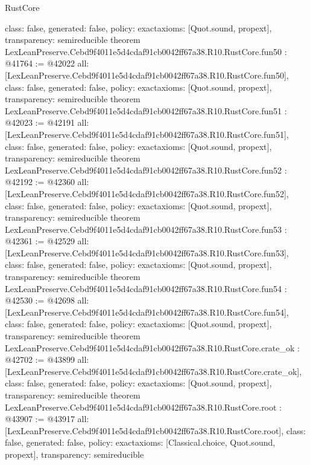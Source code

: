 \begin{lexlean}{RustCore}
\begin{coremodule}
{  class: false,
  generated: false,
  policy: exact{axioms: [Quot.sound, propext]},
  transparency: semireducible
}
theorem LexLeanPreserve.Cebd9f4011e5d4cdaf91cb0042ff67a38.R10.RustCore.fun50 : @41764 := @42022 {
  all: [LexLeanPreserve.Cebd9f4011e5d4cdaf91cb0042ff67a38.R10.RustCore.fun50],
  class: false,
  generated: false,
  policy: exact{axioms: [Quot.sound, propext]},
  transparency: semireducible
}
theorem LexLeanPreserve.Cebd9f4011e5d4cdaf91cb0042ff67a38.R10.RustCore.fun51 : @42023 := @42191 {
  all: [LexLeanPreserve.Cebd9f4011e5d4cdaf91cb0042ff67a38.R10.RustCore.fun51],
  class: false,
  generated: false,
  policy: exact{axioms: [Quot.sound, propext]},
  transparency: semireducible
}
theorem LexLeanPreserve.Cebd9f4011e5d4cdaf91cb0042ff67a38.R10.RustCore.fun52 : @42192 := @42360 {
  all: [LexLeanPreserve.Cebd9f4011e5d4cdaf91cb0042ff67a38.R10.RustCore.fun52],
  class: false,
  generated: false,
  policy: exact{axioms: [Quot.sound, propext]},
  transparency: semireducible
}
theorem LexLeanPreserve.Cebd9f4011e5d4cdaf91cb0042ff67a38.R10.RustCore.fun53 : @42361 := @42529 {
  all: [LexLeanPreserve.Cebd9f4011e5d4cdaf91cb0042ff67a38.R10.RustCore.fun53],
  class: false,
  generated: false,
  policy: exact{axioms: [Quot.sound, propext]},
  transparency: semireducible
}
theorem LexLeanPreserve.Cebd9f4011e5d4cdaf91cb0042ff67a38.R10.RustCore.fun54 : @42530 := @42698 {
  all: [LexLeanPreserve.Cebd9f4011e5d4cdaf91cb0042ff67a38.R10.RustCore.fun54],
  class: false,
  generated: false,
  policy: exact{axioms: [Quot.sound, propext]},
  transparency: semireducible
}
theorem LexLeanPreserve.Cebd9f4011e5d4cdaf91cb0042ff67a38.R10.RustCore.crate_ok : @42702 := @43899 {
  all: [LexLeanPreserve.Cebd9f4011e5d4cdaf91cb0042ff67a38.R10.RustCore.crate_ok],
  class: false,
  generated: false,
  policy: exact{axioms: [Quot.sound, propext]},
  transparency: semireducible
}
theorem LexLeanPreserve.Cebd9f4011e5d4cdaf91cb0042ff67a38.R10.RustCore.root : @43907 := @43917 {
  all: [LexLeanPreserve.Cebd9f4011e5d4cdaf91cb0042ff67a38.R10.RustCore.root],
  class: false,
  generated: false,
  policy: exact{axioms: [Classical.choice, Quot.sound, propext]},
  transparency: semireducible
}


\end{coremodule}
\end{lexlean}
